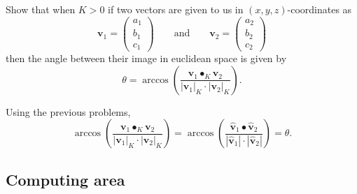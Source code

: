 \documentclass[newpage,hints,handout]{ximera}
\begin{document}
\begin{problem}
  Show that when $K>0$ if two vectors are given to us in $(x,y,z)$-coordinates as
  \[
  \mathbf{v}_{1}=\begin{pmatrix}a_{1} \\ b_{1} \\ c_{1}\end{pmatrix}
  \qquad\text{and}\qquad
  \mathbf{v}_{2} =\begin{pmatrix}a_{2} \\ b_{2} \\ c_{2}\end{pmatrix}
  \]
  then the angle between their image in euclidean space is given by
  \[
  \theta = \arccos\left(\frac{\mathbf{v}_1\bullet_K \mathbf{v}_2}{|\mathbf{v}_1|_K \cdot|\mathbf{v}_2|_K }\right).
  \]


\begin{freeResponse} Using the previous problems,
\[
\arccos\left(\frac{\mathbf{v}_1\bullet_K \mathbf{v}_2}{\left| \mathbf{v}_1\right|_K \cdot\left|\mathbf{v}_2\right|_K }\right) = \arccos\left(\frac{\hat{\mathbf v}_{1}\bullet \hat{\mathbf v}_{2}}{\left| \hat{\mathbf v}_{1}\right| \cdot\left|\hat{\mathbf v}_{2}\right| }\right) = \theta.
\]
\end{freeResponse}
\end{problem}




\subsection{Computing area}
\end{document}
